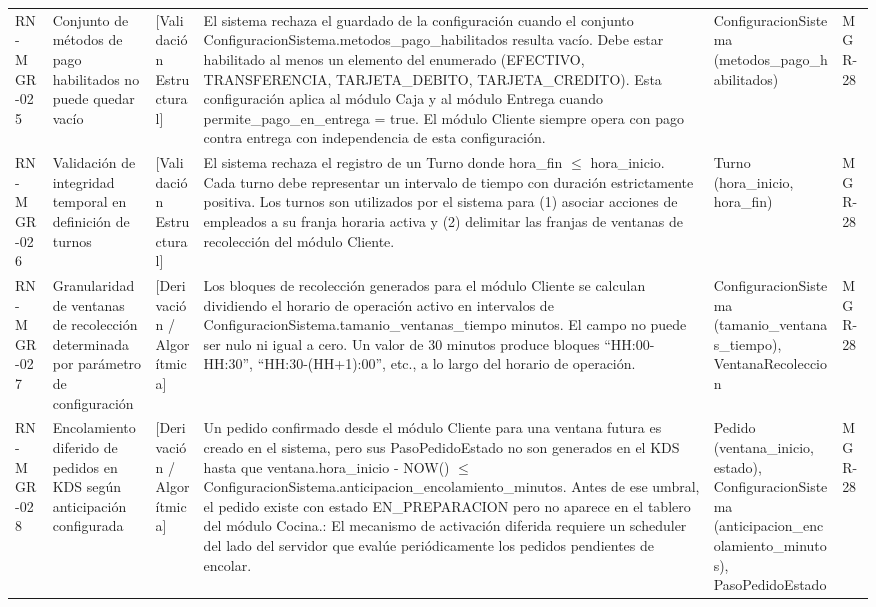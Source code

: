 \begin{landscape}
\begin{longtable}[c]{l p{2.1cm} p{2.1cm} p{8cm} p{4cm} p{3cm}}
RN-MGR-025 & Conjunto de métodos de pago habilitados no puede quedar vacío & [Validación Estructural] & El sistema rechaza el guardado de la configuración cuando el conjunto ConfiguracionSistema.metodos\_pago\_habilitados resulta vacío. Debe estar habilitado al menos un elemento del enumerado (EFECTIVO, TRANSFERENCIA, TARJETA\_DEBITO, TARJETA\_CREDITO). Esta configuración aplica al módulo Caja y al módulo Entrega cuando permite\_pago\_en\_entrega = true. El módulo Cliente siempre opera con pago contra entrega con independencia de esta configuración. & ConfiguracionSistema (metodos\_pago\_habilitados) & MGR-28 \\
\addlinespace
RN-MGR-026 & Validación de integridad temporal en definición de turnos & [Validación Estructural] & El sistema rechaza el registro de un Turno donde hora\_fin $\leq$ hora\_inicio. Cada turno debe representar un intervalo de tiempo con duración estrictamente positiva. Los turnos son utilizados por el sistema para (1) asociar acciones de empleados a su franja horaria activa y (2) delimitar las franjas de ventanas de recolección del módulo Cliente. & Turno (hora\_inicio, hora\_fin) & MGR-28 \\
\addlinespace
RN-MGR-027 & Granularidad de ventanas de recolección determinada por parámetro de configuración & [Derivación / Algorítmica] & Los bloques de recolección generados para el módulo Cliente se calculan dividiendo el horario de operación activo en intervalos de ConfiguracionSistema.tamanio\_ventanas\_tiempo minutos. El campo no puede ser nulo ni igual a cero. Un valor de 30 minutos produce bloques ``HH:00-HH:30'', ``HH:30-(HH+1):00'', etc., a lo largo del horario de operación. & ConfiguracionSistema (tamanio\_ventanas\_tiempo), VentanaRecoleccion & MGR-28 \\
\addlinespace
RN-MGR-028 & Encolamiento diferido de pedidos en KDS según anticipación configurada & [Derivación / Algorítmica] & Un pedido confirmado desde el módulo Cliente para una ventana futura es creado en el sistema, pero sus PasoPedidoEstado no son generados en el KDS hasta que ventana.hora\_inicio - NOW() $\leq$ ConfiguracionSistema.anticipacion\_encolamiento\_minutos. Antes de ese umbral, el pedido existe con estado EN\_PREPARACION pero no aparece en el tablero del módulo Cocina.: El mecanismo de activación diferida requiere un scheduler del lado del servidor que evalúe periódicamente los pedidos pendientes de encolar. & Pedido (ventana\_inicio, estado), ConfiguracionSistema (anticipacion\_encolamiento\_minutos), PasoPedidoEstado & MGR-28 \\

\end{longtable}
\end{landscape}
